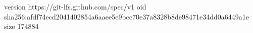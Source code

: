 version https://git-lfs.github.com/spec/v1
oid sha256:afdf74ecd2041402854a6aaee5e9bcc70e37a8328b8de98471e34dd0a6449a1e
size 174884
